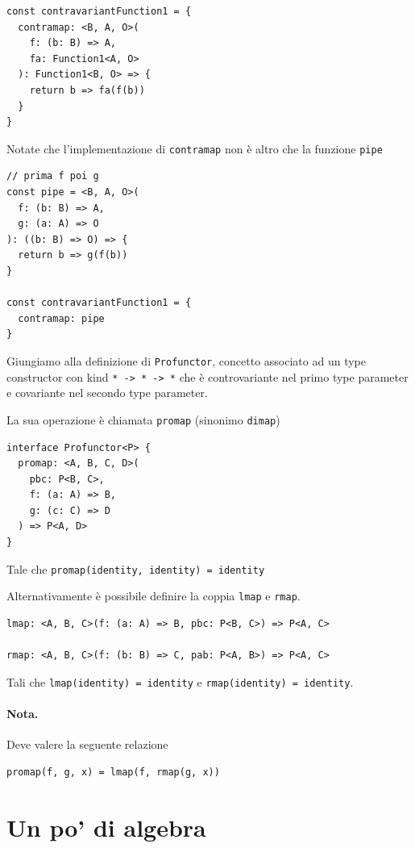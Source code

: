 \documentclass[12pt]{article}
\begin{document}
\begin{verbatim}
const contravariantFunction1 = {
  contramap: <B, A, O>(
    f: (b: B) => A,
    fa: Function1<A, O>
  ): Function1<B, O> => {
    return b => fa(f(b))
  }
}
\end{verbatim}

Notate che l'implementazione di \texttt{contramap} non è altro che la funzione \texttt{pipe}

\begin{verbatim}
// prima f poi g
const pipe = <B, A, O>(
  f: (b: B) => A,
  g: (a: A) => O
): ((b: B) => O) => {
  return b => g(f(b))
}

const contravariantFunction1 = {
  contramap: pipe
}
\end{verbatim}

Giungiamo alla definizione di \texttt{Profunctor}, concetto associato ad un type constructor con kind \texttt{* -> * -> *} che è
controvariante nel primo type parameter e covariante nel secondo type parameter.

La sua operazione è chiamata \texttt{promap} (sinonimo \texttt{dimap})

\begin{verbatim}
interface Profunctor<P> {
  promap: <A, B, C, D>(
    pbc: P<B, C>,
    f: (a: A) => B,
    g: (c: C) => D
  ) => P<A, D>
}
\end{verbatim}

Tale che \texttt{promap(identity, identity) = identity}

Alternativamente è possibile definire la coppia \texttt{lmap} e \texttt{rmap}.

\begin{verbatim}
lmap: <A, B, C>(f: (a: A) => B, pbc: P<B, C>) => P<A, C>

rmap: <A, B, C>(f: (b: B) => C, pab: P<A, B>) => P<A, C>
\end{verbatim}

Tali che \texttt{lmap(identity) = identity} e \texttt{rmap(identity) = identity}.

\paragraph{Nota. } Deve valere la seguente relazione

\begin{verbatim}
promap(f, g, x) = lmap(f, rmap(g, x))
\end{verbatim}

\newpage

\section{Un po' di algebra}
\end{document}
